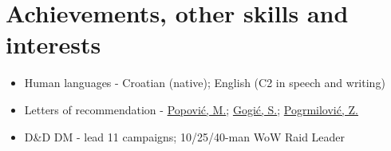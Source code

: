 \documentclass[a4paper]{article}
\begin{document}
\section{Achievements, other skills and interests}

\begin{itemize}
  \item Human languages - Croatian (native); English (C2 in speech and writing)
  \item Letters of recommendation - \href{https://github.com/MislavJaksic/Latex-Overleaf/blob/master/CV/AISoft_Popovic.pdf}{Popović, M.}; \href{https://github.com/MislavJaksic/Latex-Overleaf/blob/master/CV/Atos_Gogic.pdf}{Gogić, S.}; \href{https://github.com/MislavJaksic/Latex-Overleaf/blob/master/CV/Atos_Pogrmilovic.pdf}{Pogrmilović, Z.}
  \item D\&D DM - lead 11 campaigns; 10/25/40-man WoW Raid Leader
\end{itemize}
\end{document}
